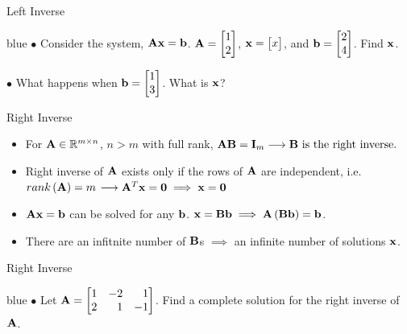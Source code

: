 \documentclass[aspectratio=169]{beamer}
\let\olditem\item
\renewcommand{\item}{\setlength{\itemsep}{\fill}\olditem}
\def\mf{\ensuremath\mathbf}
\def\mb{\ensuremath\mathbb}
\begin{document}
\begin{frame}[t]{Left Inverse}
\begin{color}{blue}
    $\bullet$ Consider the system, $\mf{Ax} = \mf{b}$. $\mf{A} = \begin{bmatrix*}[r]1\\2\end{bmatrix*}$, $\mf{x} = \begin{bmatrix*}x\end{bmatrix*}$, and $\mf{b} = \begin{bmatrix*}2\\4\end{bmatrix*}$. Find $\mf{x}$.\\
    \vspace{2cm}
    
    $\bullet$ What happens when $\mf{b} = \begin{bmatrix*}1\\3\end{bmatrix*}$. What is $\mf{x}$?
\end{color}
\end{frame}


\begin{frame}[t]{Right Inverse}
\begin{itemize}
    \item For $\mf{A} \in \mb{R}^{m \times n}$, $n > m$ with full rank, $\mf{AB} = \mf{I}_m \longrightarrow \mf{B} \text{ is the right inverse.}$

    \item Right inverse of $\mf{A}$ exists only if the rows of $\mf{A}$ are independent, i.e. $rank\left(\mf{A}\right) = m$ $\longrightarrow \mf{A}^T\mf{x} = \mf{0} \implies \mf{x} = \mf{0}$

    \item $\mf{Ax} = \mf{b}$ can be solved for any $\mf{b}$. $\mf{x} = \mf{Bb} \implies \mf{A}\left(\mf{Bb}\right) = \mf{b}$. 

    \item There are an infitnite number of $\mf{B}$s $\implies$ an infinite number of solutions $\mf{x}$.
\end{itemize}
\end{frame}


\begin{frame}[t]{Right Inverse}
\begin{color}{blue}
    $\bullet$ Let $\mf{A} = \begin{bmatrix*}[r]1 & -2 & 1\\2 & 1 & -1\end{bmatrix*}$. Find a complete solution for the right inverse of $\mf{A}$.
\end{color}
\end{frame}
\end{document}
